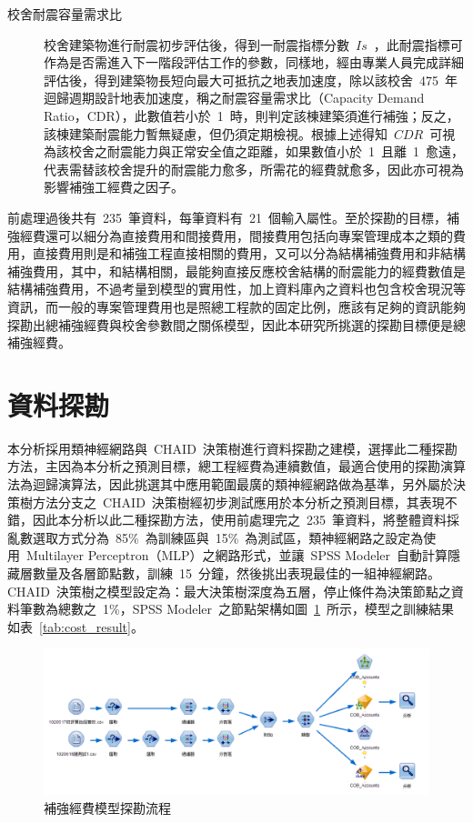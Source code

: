 \begin{description}
  \item[校舍耐震容量需求比]
  \cite{ncree09026}校舍建築物進行耐震初步評估後，得到一耐震指標分數~$Is$~，此耐震指標可作為是否需進入下一階段評估工作的參數，同樣地，經由專業人員完成詳細評估後，得到建築物長短向最大可抵抗之地表加速度，除以該校舍~475~年迴歸週期設計地表加速度，稱之耐震容量需求比（Capacity Demand Ratio，CDR），此數值若小於~1~時，則判定該棟建築須進行補強；反之，該棟建築耐震能力暫無疑慮，但仍須定期檢視。根據上述得知~$CDR$~可視為該校舍之耐震能力與正常安全值之距離，如果數值小於~1~且離~1~愈遠，代表需替該校舍提升的耐震能力愈多，所需花的經費就愈多，因此亦可視為影響補強工經費之因子。
\end{description}

前處理過後共有~235~筆資料，每筆資料有~21~個輸入屬性。至於探勘的目標，補強經費還可以細分為直接費用和間接費用，間接費用包括向專案管理成本之類的費用，直接費用則是和補強工程直接相關的費用，又可以分為結構補強費用和非結構補強費用，其中，和結構相關，最能夠直接反應校舍結構的耐震能力的經費數值是結構補強費用，不過考量到模型的實用性，加上資料庫內之資料也包含校舍現況等資訊，而一般的專案管理費用也是照總工程款的固定比例，應該有足夠的資訊能夠探勘出總補強經費與校舍參數間之關係模型，因此本研究所挑選的探勘目標便是總補強經費。

\section{資料探勘}

本分析採用類神經網路與~CHAID~決策樹進行資料探勘之建模，選擇此二種探勘方法，主因為本分析之預測目標，總工程經費為連續數值，最適合使用的探勘演算法為迴歸演算法，因此挑選其中應用範圍最廣的類神經網路做為基準，另外屬於決策樹方法分支之~CHAID~決策樹經初步測試應用於本分析之預測目標，其表現不錯，因此本分析以此二種探勘方法，使用前處理完之~235~筆資料，將整體資料採亂數選取方式分為~85\%~為訓練區與~15\%~為測試區，類神經網路之設定為使用~Multilayer Perceptron（MLP）之網路形式，並讓~SPSS Modeler~自動計算隱藏層數量及各層節點數，訓練~15~分鐘，然後挑出表現最佳的一組神經網路。CHAID~決策樹之模型設定為：最大決策樹深度為五層，停止條件為決策節點之資料筆數為總數之~1\%，SPSS Modeler~之節點架構如圖~\ref{fig:cob-flow}~所示，模型之訓練結果如表~\ref{tab:cost_result}。

\begin{figure}[hbtp]
  \begin{center}
    \includegraphics[width=1.0\textwidth]{figures/cob-flow.png}
    \caption{補強經費模型探勘流程} 
    \label{fig:cob-flow}
  \end{center}
\end{figure}

